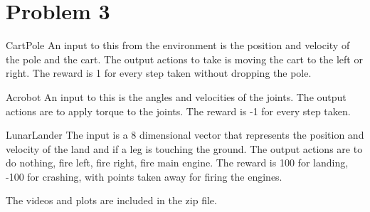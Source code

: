 \documentclass[12pt]{article}
\begin{document}
\section*{Problem 3}

CartPole
An input to this from the environment is the position and velocity of the pole and the cart.
The output actions to take is moving the cart to the left or right.
The reward is 1 for every step taken without dropping the pole.


Acrobot
An input to this is the angles and velocities of the joints.
The output actions are to apply torque to the joints.
The reward is -1 for every step taken.


LunarLander
The input is a 8 dimensional vector that represents the position and velocity of the land and if a leg is touching the ground.
The output actions are to do nothing, fire left, fire right, fire main engine.
The reward is 100 for landing, -100 for crashing, with points taken away for firing the engines.

The videos and plots are included in the zip file.
\end{document}

